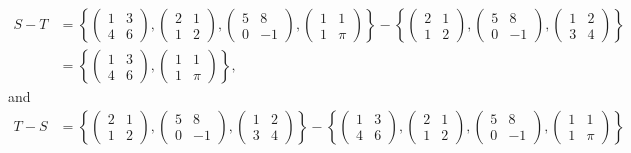 \documentclass[12pt]{article}
\numberwithin{theorem}{section}
\numberwithin{equation}{section}
\numberwithin{remark}{section}
\numberwithin{definition}{section}
\numberwithin{theorem}{section}
\numberwithin{lemma}{section}
\numberwithin{example}{section}
\begin{document}
\begin{itemize}
{\begin{align*}
			S-T & = \left\{\begin{pmatrix} 1 & 3 \\ 4 & 6 \end{pmatrix}, \begin{pmatrix} 2 & 1 \\ 1 & 2 \end{pmatrix}, \begin{pmatrix} 5 & 8 \\ 0 & -1 \end{pmatrix}, \begin{pmatrix} 1 & 1 \\ 1 & \pi \end{pmatrix}\right\} - \left\{\begin{pmatrix} 2 & 1 \\ 1 & 2 \end{pmatrix}, \begin{pmatrix} 5 & 8 \\ 0 & -1 \end{pmatrix}, \begin{pmatrix} 1 & 2 \\ 3 & 4 \end{pmatrix}\right\} \\
 			& = \left\{\begin{pmatrix} 1 & 3 \\ 4 & 6 \end{pmatrix}, \begin{pmatrix} 1 & 1 \\ 1 & \pi \end{pmatrix}\right\},
 		\end{align*}
 		and
		\begin{align*}
			T-S & = \left\{\begin{pmatrix} 2 & 1 \\ 1 & 2 \end{pmatrix}, \begin{pmatrix} 5 & 8 \\ 0 & -1 \end{pmatrix}, \begin{pmatrix} 1 & 2 \\ 3 & 4 \end{pmatrix}\right\} - \left\{\begin{pmatrix} 1 & 3 \\ 4 & 6 \end{pmatrix}, \begin{pmatrix} 2 & 1 \\ 1 & 2 \end{pmatrix}, \begin{pmatrix} 5 & 8 \\ 0 & -1 \end{pmatrix}, \begin{pmatrix} 1 & 1 \\ 1 & \pi \end{pmatrix}\right\} \\

\end{align*}}
\end{itemize}
\end{document}
